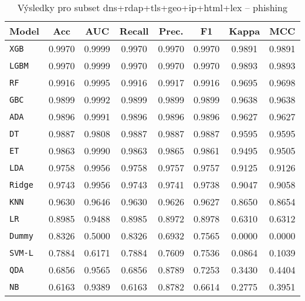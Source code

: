 \begin{table}[H]
  \centering
  \small
  \caption{Výsledky pro subset dns+rdap+tls+geo+ip+html+lex – phishing}
  \begin{tabular}{|l|c|c|c|c|c|c|c|}
    \hline
    \textbf{Model} & \textbf{Acc} & \textbf{AUC} & \textbf{Recall} & \textbf{Prec.} & \textbf{F1} & \textbf{Kappa} & \textbf{MCC} \\
    \hline
    \texttt{XGB} & 0.9970 & 0.9999 & 0.9970 & 0.9970 & 0.9970 & 0.9891 & 0.9891 \\
    \texttt{LGBM} & 0.9970 & 0.9999 & 0.9970 & 0.9970 & 0.9970 & 0.9893 & 0.9893 \\
    \texttt{RF} & 0.9916 & 0.9995 & 0.9916 & 0.9917 & 0.9916 & 0.9695 & 0.9698 \\
    \texttt{GBC} & 0.9899 & 0.9992 & 0.9899 & 0.9899 & 0.9899 & 0.9638 & 0.9638 \\
    \texttt{ADA} & 0.9896 & 0.9991 & 0.9896 & 0.9896 & 0.9896 & 0.9627 & 0.9627 \\
    \texttt{DT} & 0.9887 & 0.9808 & 0.9887 & 0.9887 & 0.9887 & 0.9595 & 0.9595 \\
    \texttt{ET} & 0.9863 & 0.9990 & 0.9863 & 0.9865 & 0.9861 & 0.9495 & 0.9505 \\
    \texttt{LDA} & 0.9758 & 0.9956 & 0.9758 & 0.9757 & 0.9757 & 0.9125 & 0.9126 \\
    \texttt{Ridge} & 0.9743 & 0.9956 & 0.9743 & 0.9741 & 0.9738 & 0.9047 & 0.9058 \\
    \texttt{KNN} & 0.9630 & 0.9646 & 0.9630 & 0.9626 & 0.9627 & 0.8650 & 0.8654 \\
    \texttt{LR} & 0.8985 & 0.9488 & 0.8985 & 0.8972 & 0.8978 & 0.6310 & 0.6312 \\
    \texttt{Dummy} & 0.8326 & 0.5000 & 0.8326 & 0.6932 & 0.7565 & 0.0000 & 0.0000 \\
    \texttt{SVM-L} & 0.7884 & 0.6171 & 0.7884 & 0.7609 & 0.7536 & 0.0864 & 0.1039 \\
    \texttt{QDA} & 0.6856 & 0.9565 & 0.6856 & 0.8789 & 0.7253 & 0.3430 & 0.4404 \\
    \texttt{NB} & 0.6163 & 0.9389 & 0.6163 & 0.8782 & 0.6614 & 0.2775 & 0.3951 \\
    \hline
  \end{tabular}
\end{table}
\vspace{0.5cm}

